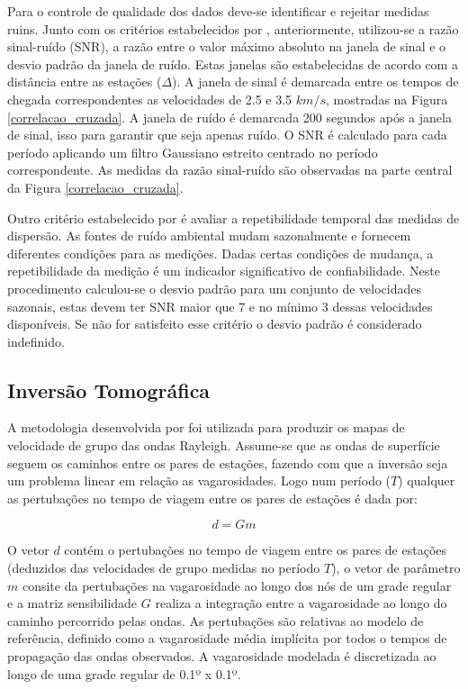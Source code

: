 Para o controle de qualidade dos dados deve-se identificar e rejeitar medidas ruins. Junto com os critérios estabelecidos por \cite{bensen_processing_2007}, anteriormente, utilizou-se a razão sinal-ruído (SNR), a razão entre o valor máximo absoluto na janela de sinal e o desvio padrão da janela de ruído. Estas janelas são estabelecidas de acordo com a distância entre as estações ($\Delta$). A janela de sinal é demarcada entre os tempos de chegada correspondentes as velocidades de 2.5 e 3.5 $km/s$, mostradas na Figura \ref{correlacao_cruzada}. A janela de ruído é demarcada 200 segundos após a janela de sinal, isso para garantir que seja apenas ruído. O SNR é calculado para cada período aplicando um filtro Gaussiano estreito centrado no período correspondente. As medidas da razão sinal-ruído são observadas na parte central da Figura \ref{correlacao_cruzada}. 

Outro critério estabelecido por \cite{bensen_processing_2007} é avaliar a repetibilidade temporal das medidas de dispersão. As fontes de ruído ambiental mudam sazonalmente e fornecem diferentes condições para as medições. Dadas certas condições de mudança, a repetibilidade da medição é um indicador significativo de confiabilidade. Neste procedimento calculou-se o desvio padrão para um conjunto de velocidades sazonais, estas devem ter SNR maior que 7 e no mínimo 3 dessas velocidades disponíveis. Se não for satisfeito esse critério o desvio padrão é considerado indefinido.

\subsection{Inversão Tomográfica}

A metodologia desenvolvida por  \cite{barmin_fast_2001} foi utilizada para produzir os mapas de velocidade de grupo das ondas Rayleigh. Assume-se que as ondas de superfície seguem os caminhos entre os pares de estações, fazendo com que a inversão seja um problema linear em relação as vagarosidades. Logo num período ($T$) qualquer as pertubações no tempo de viagem entre os pares de estações é dada por:

\begin{equation}
d=Gm
\end{equation} 

O vetor $d$ contém o pertubações no tempo de viagem entre os pares de estações (deduzidos das velocidades de grupo medidas no período $T$), o vetor de parâmetro $m$ consite da pertubações na vagarosidade ao longo dos nós de um grade regular e a matriz sensibilidade $G$ realiza a integração entre a vagarosidade ao longo do caminho percorrido pelas ondas. As pertubações são relativas ao modelo de referência, definido como a vagarosidade média implícita por todos o tempos de propagação das ondas observados. A vagarosidade modelada é discretizada ao longo de uma grade regular de 0.1º x 0.1º. 

